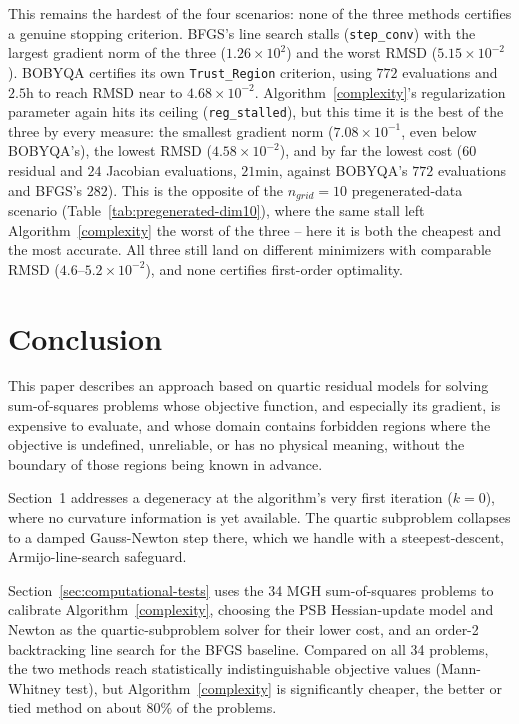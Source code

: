 \documentclass[11pt]{article}
\begin{document}
\noindent
This remains the hardest of the four scenarios: none of the three
methods certifies a genuine stopping criterion. BFGS's line search
stalls (\texttt{step\_conv}) with the
largest gradient norm of the three ($1.26\times10^2$) and the
worst RMSD ($5.15\times10^{-2}$). BOBYQA certifies its own
\texttt{Trust\_Region} criterion, using $772$ evaluations and
$2.5$h to reach RMSD near to $4.68\times10^{-2}$. Algorithm~\ref{complexity}'s
regularization parameter again hits its ceiling
(\texttt{reg\_stalled}), but this time it is the best of the three by
every measure: the smallest gradient norm ($7.08\times10^{-1}$,
even below BOBYQA's), the lowest RMSD ($4.58\times10^{-2}$), and by far
the lowest cost ($60$ residual and $24$ Jacobian evaluations,
$21$min, against BOBYQA's $772$ evaluations and BFGS's
$282$). This is the opposite of the $n_{grid}=10$ pregenerated-data
scenario (Table~\ref{tab:pregenerated-dim10}), where the same stall left
Algorithm~\ref{complexity} the worst of the three -- here it is both the cheapest
and the most accurate. All three still land on different minimizers with
comparable RMSD ($4.6$--$5.2\times10^{-2}$), and none certifies
first-order optimality.



\section{Conclusion}

This paper describes an approach based on quartic residual models for
solving sum-of-squares problems whose objective function, and
especially its gradient, is expensive to evaluate, and whose domain
contains forbidden regions where the objective is undefined,
unreliable, or has no physical meaning, without the boundary of those
regions being known in advance.

Section~1 addresses a degeneracy at the algorithm's very first
iteration ($k=0$), where no curvature information is yet available.
The quartic subproblem collapses to a damped Gauss-Newton step there,
which we handle with a steepest-descent, Armijo-line-search safeguard.

Section~\ref{sec:computational-tests} uses the 34 MGH sum-of-squares
problems to calibrate Algorithm~\ref{complexity}, choosing the PSB
Hessian-update model and Newton as the quartic-subproblem solver for
their lower cost, and an order-2 backtracking line search for the BFGS
baseline. Compared on all 34 problems, the two methods reach
statistically indistinguishable objective values (Mann-Whitney test),
but Algorithm~\ref{complexity} is significantly cheaper, the better or
tied method on about 80\% of the problems.
\end{document}
